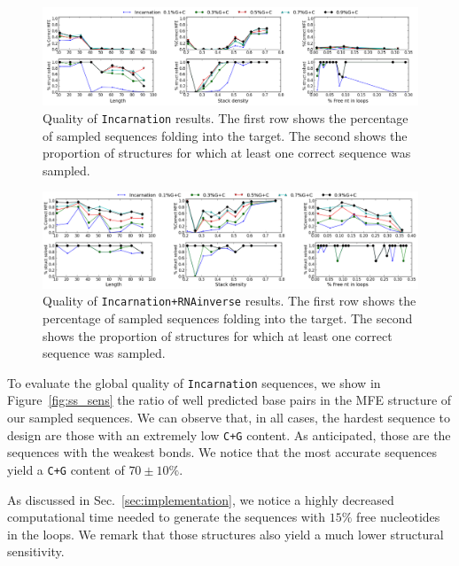 \begin{figure}[ht!]	
	\centering
	\includegraphics[width=\textwidth]{Figures/mfe_struct_solve_nornainverse.png}
	\caption{Quality of \texttt{Incarnation} results. The first row shows the percentage
	of sampled sequences folding into the target. The second shows the 	
	proportion	of structures for which at least one correct sequence was 
	sampled.}
	\label{fig:mfe_struct_solved_noinverse}	
\end{figure}



\begin{figure}[ht!]	
	\centering
	\includegraphics[width=\textwidth]{Figures/mfe_struct_solved}
	\caption{Quality of \texttt{Incarnation+RNAinverse} results. The first row shows the percentage
	of sampled sequences folding into the target. The second shows the 	
	proportion	of structures for which at least one correct sequence was 
	sampled.}
	\label{fig:mfe_struct_solved}	
\end{figure}
 
To evaluate the global quality of \texttt{Incarnation} sequences, we show
in Figure~\ref{fig:ss_sens} the ratio of well predicted base pairs in the
MFE structure of our sampled sequences. We can observe that, in all cases,
the hardest sequence to design are those with an extremely low \texttt{C+G}
content. As anticipated, those are the sequences with the weakest bonds.
We notice that the most accurate sequences yield a \texttt{C+G} content
of $70\pm 10\%$. 

As discussed in Sec.~\ref{sec:implementation}, we notice a highly decreased
computational time needed to generate the sequences with $15\%$ free 
nucleotides in the loops. We remark that those structures also yield 
a much lower structural sensitivity.

